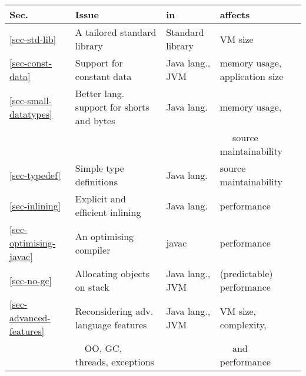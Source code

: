 \begin{tabular}{l|l|l|l}
\hline
\bfseries Sec.              & \bfseries Issue                               & \bfseries in     & \bfseries affects \\
\hline\hline
\ref{sec-std-lib}           & A tailored standard library                   & Standard library & VM size \\
\ref{sec-const-data}        & Support for constant data                     & Java lang., JVM  & memory usage, application size \\
\ref{sec-small-datatypes}   & Better lang. support for shorts and bytes     & Java lang.       & memory usage, \\
                            &                                               &                  & ~~  source maintainability\\
\ref{sec-typedef}           & Simple type definitions                       & Java lang.       & source maintainability \\
\ref{sec-inlining}          & Explicit and efficient inlining               & Java lang.       & performance \\
\ref{sec-optimising-javac}  & An optimising compiler                        & javac            & performance \\
\ref{sec-no-gc}             & Allocating objects on stack                   & Java lang., JVM  & (predictable) performance \\
\ref{sec-advanced-features} & Reconsidering adv. language features          & Java lang., JVM  & VM size, complexity, \\
                            & ~~OO, GC, threads, exceptions                 &                  & ~~ and performance \\
\hline
\end{tabular}

